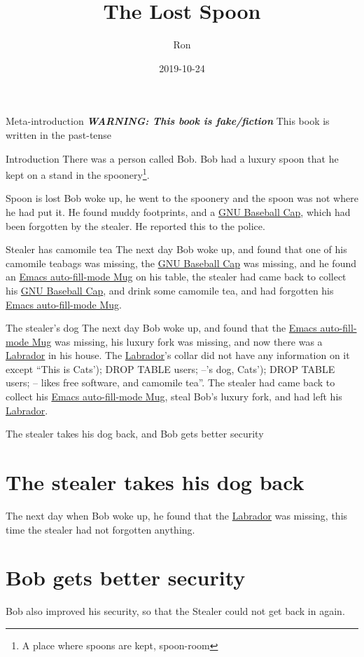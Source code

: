 \documentclass[openany]{book}
\newcommand{\warning}[1]{\textbf{\textit{WARNING: #1}}}
\newcommand{\GNUBaseballCap}{\href{https://shop.fsf.org/caps/gnu-baseball-cap}{GNU Baseball Cap}}
\newcommand{\EmacsMug}{\href{https://shop.fsf.org/gear/emacs-auto-fill-mode-mug}{Emacs auto-fill-mode Mug}}
\newcommand{\Labrador}{\href{https://en.wikipedia.org/wiki/Labrador\_Retriever}{Labrador}}
\newcommand{\CatsName}{Cats'); DROP TABLE users; --}
\begin{document}
\title{The Lost Spoon}
\author{Ron}
\date{2019-10-24}
\maketitle

\begin{chapter}{Meta-introduction}
  \doclicenseThis
  \warning{This book is fake/fiction}
  \newline
  This book is written in the past-tense
\end{chapter}

\begin{chapter}{Introduction}
  There was a person called Bob.
  Bob had a luxury spoon that he kept on a stand in the spoonery\footnote{A place where spoons are kept, spoon-room}.
\end{chapter}

\begin{chapter}{Spoon is lost}
  Bob woke up, he went to the spoonery and the spoon was not where he had put it.
  He found muddy footprints, and a \GNUBaseballCap, which had been forgotten by the stealer.
  He reported this to the police.
\end{chapter}

\begin{chapter}{Stealer has camomile tea}
  The next day Bob woke up, and found that one of his camomile teabags was missing, the \GNUBaseballCap{} was missing,
  and he found an \EmacsMug{} on his table, the stealer had came back to collect his \GNUBaseballCap, and drink some camomile tea,
  and had forgotten his \EmacsMug.
\end{chapter}

\begin{chapter}{The stealer's dog}
  The next day Bob woke up, and found that the \EmacsMug{} was missing, his luxury fork was missing,
  and now there was a \Labrador{} in his house.
  The \Labrador's collar did not have any information on it except ``This is \CatsName's dog, \CatsName{} likes free software, and camomile tea''.
  The stealer had came back to collect his \EmacsMug, steal Bob's luxury fork, and had left his \Labrador.
\end{chapter}

\begin{chapter}{The stealer takes his dog back, and Bob gets better security}
  \section{The stealer takes his dog back}{
    The next day when Bob woke up, he found that the \Labrador{} was missing, this time the stealer had not forgotten anything.
  }
  \section{Bob gets better security}{
    Bob also improved his security, so that the Stealer could not get back in again.
  }
\end{chapter}
\end{document}
